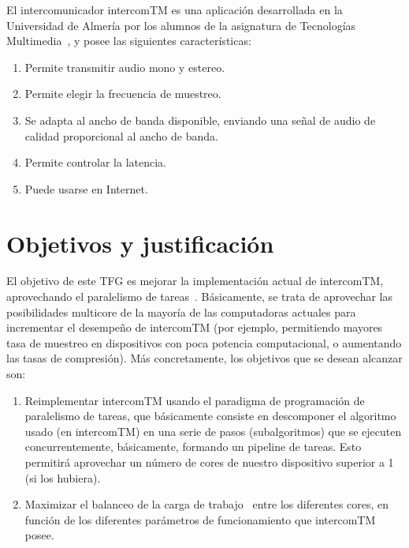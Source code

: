\documentclass[titlepage, 12pt, a4paper, oneside]{article}
\begin{document}
El intercomunicador intercomTM es una aplicación desarrollada en la
Universidad de Almería por los alumnos de la asignatura de Tecnologías
Multimedia~\cite{intercomTM}, y posee las siguientes características:
\begin{enumerate}
\item Permite transmitir audio mono y estereo.
\item Permite elegir la frecuencia de muestreo.
\item Se adapta al ancho de banda disponible, enviando una señal de
  audio de calidad proporcional al ancho de banda.
\item Permite controlar la latencia.
\item Puede usarse en Internet.
\end{enumerate}

\section{Objetivos y justificación}
\label{sec:objetivos}
El objetivo de este TFG es mejorar la implementación actual de
intercomTM, aprovechando el paralelismo de
tareas~\cite{pacheco2011introduction}. Básicamente, se trata de
aprovechar las posibilidades multicore de la mayoría de las
computadoras actuales para incrementar el desempeño de intercomTM
(por ejemplo, permitiendo mayores tasa de muestreo en dispositivos con
poca potencia computacional, o aumentando las tasas de
compresión). Más concretamente, los objetivos que se desean alcanzar
son:
\begin{enumerate}
\item Reimplementar intercomTM usando el paradigma de programación de
  paralelismo de tareas, que básicamente consiste en descomponer el
  algoritmo usado (en intercomTM) en una serie de pasos
  (subalgoritmos) que se ejecuten concurrentemente, básicamente,
  formando un pipeline de tareas. Esto permitirá aprovechar un número
  de cores de nuestro dispositivo superior a 1 (si los hubiera).
\item Maximizar el balanceo de la carga de trabajo~\cite{workload}
  entre los diferentes cores, en función de los diferentes parámetros
  de funcionamiento que intercomTM posee.
\end{enumerate}
\end{document}

